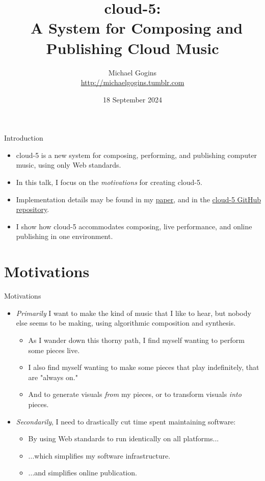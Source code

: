 \documentclass{beamer}
\title[cloud-5] %
{cloud-5: \\\
A System for Composing and Publishing Cloud Music}
\author[Gogins] %
{Michael Gogins \\ \url{http://michaelgogins.tumblr.com} }
\institute[Irreducible Productions] %
{
  Irreducible Productions\\
  New York
}
\date[18 September 2024] %
{18 September 2024}
\begin{document}

\begin{frame}
  \titlepage
\end{frame}

\begin{frame}{Introduction}
\begin{itemize}
\item cloud-5 is a new system for composing, performing, and publishing computer music, using only Web standards.
\item In this talk, I focus on the \emph{motivations} for creating cloud-5.
\item Implementation details may be found in my \href{https://github.com/gogins/michael.gogins.studio/blob/master/music/ICSC-2024/cloud-5.pdf}{paper}, and in the \href{https://github.com/gogins/cloud-5}{cloud-5 GitHub repository}.
\item I show how cloud-5 accommodates composing, live performance, and online publishing in one environment. 
\end{itemize}
\end{frame}


\section{Motivations}

\begin{frame}{Motivations}
\begin{itemize}
\item \emph{Primarily} I want to make the kind of music that I like to hear, but nobody else seems to be making, using algorithmic composition and synthesis.
\begin{itemize}
\item As I wander down this thorny path, I find myself wanting to perform some pieces live.
\item I also find myself wanting to make some pieces that play indefinitely, that are "always on."
\item And to generate visuals \emph{from} my pieces, or to transform visuals \emph{into} pieces.
\end{itemize}
\item \emph{Secondarily}, I need to drastically cut time spent maintaining software:
\begin{itemize}
\item By using Web standards to run identically on all platforms...
\item ...which simplifies my software infrastructure.
\item ...and simplifies online publication.
\end{itemize}
\end{itemize}
\end{frame}
\end{document}

